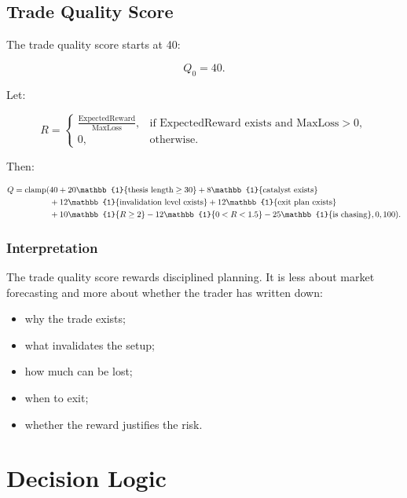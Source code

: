 \documentclass[11pt]{article}
\newcommand{\indicator}[1]{\mathbb{1}\{#1\}}
\newcommand{\clamp}{\operatorname{clamp}}
\begin{document}
\subsection{Trade Quality Score}

The trade quality score starts at 40:

\begin{equation}
Q_0 = 40.
\end{equation}

Let:

\begin{equation}
R =
\begin{cases}
\frac{\text{ExpectedReward}}{\text{MaxLoss}}, & \text{if ExpectedReward exists and MaxLoss} > 0,\\
0, & \text{otherwise}.
\end{cases}
\end{equation}

Then:

\begin{align}
Q = \clamp(&40
 + 20\indicator{\text{thesis length} \ge 30}
 + 8\indicator{\text{catalyst exists}} \notag \\
&+ 12\indicator{\text{invalidation level exists}}
 + 12\indicator{\text{exit plan exists}} \notag \\
&+ 10\indicator{R \ge 2}
 - 12\indicator{0 < R < 1.5}
 - 25\indicator{\text{is chasing}},
0,100).
\end{align}

\subsubsection{Interpretation}

The trade quality score rewards disciplined planning. It is less about market forecasting and more about whether the trader has written down:

\begin{itemize}[noitemsep]
  \item why the trade exists;
  \item what invalidates the setup;
  \item how much can be lost;
  \item when to exit;
  \item whether the reward justifies the risk.
\end{itemize}

\section{Decision Logic}
\end{document}
